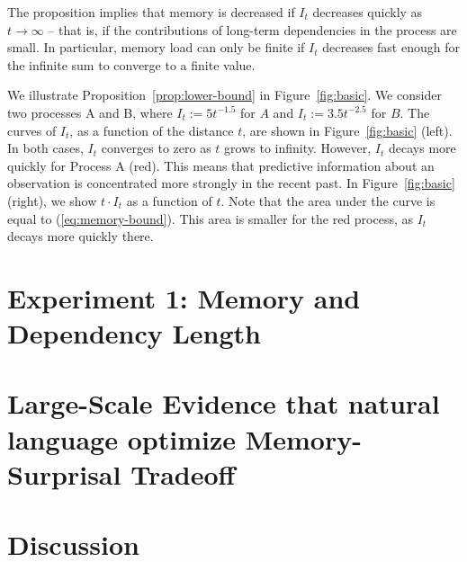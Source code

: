 \documentclass[11pt,letterpaper]{article}
\begin{document}
The proposition implies that memory is decreased if $I_t$ decreases quickly as $t \rightarrow \infty$ -- that is, if the contributions of long-term dependencies in the process are small.
In particular, memory load can only be finite if $I_t$ decreases fast enough for the infinite sum to converge to a finite value.


We illustrate Proposition~\ref{prop:lower-bound} in Figure~\ref{fig:basic}.
We consider two processes A and B, where $I_t := 5t^{-1.5}$ for $A$ and $I_t := 3.5 t^{-2.5}$ for $B$.
The curves of $I_t$, as a function of the distance $t$, are shown in Figure~\ref{fig:basic} (left).
In both cases, $I_t$ converges to zero as $t$ grows to infinity. 
However, $I_t$ decays more quickly for Process A (red).
This means that predictive information about an observation is concentrated more strongly in the recent past.
In Figure~\ref{fig:basic} (right), we show $t\cdot I_t$ as a function of $t$.
Note that the area under the curve is equal to (\ref{eq:memory-bound}).
This area is smaller for the red process, as $I_t$ decays more quickly there.  


\section{Experiment 1: Memory and Dependency Length}





\section{Large-Scale Evidence that natural language optimize Memory-Surprisal Tradeoff}



\section{Discussion}
\end{document}
